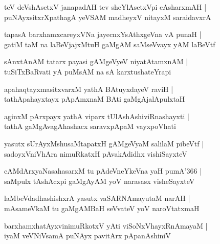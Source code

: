 \documentclass[twoside,12pt,openright]{book}
\newcounter{shloka}[chapter]
\begin{document}
\begin{shloka}%
teV deVshAsetxV janapadAH tev sheYlAsetxVpi cAsharxmAH |\\
puNAyxsitxrXpathagA yeVSAM madheyxV nitayxM saraidavxrA 
\end{shloka}

\begin{shloka}%
tapasA barxhamxcareyxVNa jayecnxYsAthxgeVna vA punaH |\\
gatiM taM na laBeVjajxMtuH gaMgAM saMseVvayx yAM laBeVtf
\end{shloka}

\begin{shloka}%
sAnxtAnAM tatarx payasi gAMgeVyeV niyatAtamxnAM |\\
tuSiTxBaRvati yA puMsAM na sA karxtushateYrapi
\end{shloka}

\begin{shloka}%
apahaqtayxmasitxvarxM yathA BAtuyxdayeV raviH |\\
tathApahayxtayx pApAmxnaM BAti gaMgAjalApulxtaH 
\end{shloka}

\begin{shloka}%
aginxM pArxpayx yathA viparx tUlAshAshiviRnashayxti |\\
tathA gaMgAvagAhashacx saravxpApaM vayxpoVhati 
\end{shloka}

\begin{shloka}%
yasutx sUrAyxMshusaMtapatxH gAMgeVyaM salilaM pibeVtf |\\
sadoyxVniVhAra nimuRkatxH pAvakAdidhx vishiSayxteV 
\end{shloka}

\begin{shloka}%
cAMdArxyaNasahasarxM tu pAdeVneYkeVna yaH pumA\char'366 |\\
saMpulx tAshAcxpi gaMgAyAM yoV narasasx visheSayxteV
\end{shloka}

\begin{shloka}%
laMbeVdadhashishxrA yasutx vaSARNAmayutaM narAH |\\
mAsameVkaM tu gaMgAMBaH seVvateV yoV naroVtatxmaH
\end{shloka}

\begin{shloka}%
barxhamxhatAyxvinimuRkotxV yAti viSoNxVhayxRnAmayaM |\\
iyaM veVNiVsamA puNAyx pavitArx pApanAshiniV 
\end{shloka}
\end{document}
